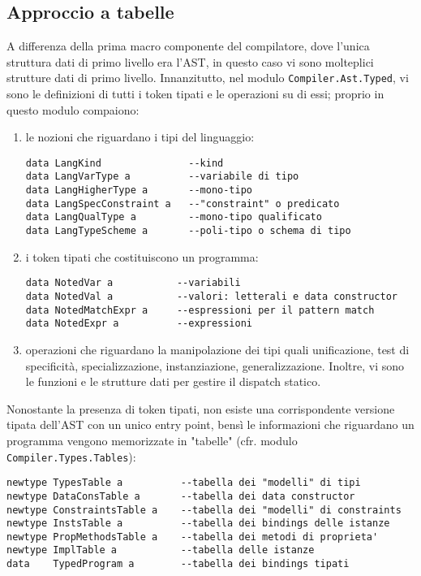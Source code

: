 \documentclass[10pt,a4paper]{article}
\begin{document}
\subsection{Approccio a tabelle}
A differenza della prima macro componente del compilatore, dove l'unica struttura dati di primo livello era l'AST, in
questo caso vi sono molteplici strutture dati di primo livello. Innanzitutto, nel modulo \texttt{Compiler.Ast.Typed},
vi sono le definizioni di tutti i token tipati e le operazioni su di essi; proprio in questo modulo compaiono:
\begin{enumerate}
    \item le nozioni che riguardano i tipi del linguaggio:
    \begin{lstlisting}
data LangKind               --kind
data LangVarType a          --variabile di tipo
data LangHigherType a       --mono-tipo
data LangSpecConstraint a   --"constraint" o predicato
data LangQualType a         --mono-tipo qualificato
data LangTypeScheme a       --poli-tipo o schema di tipo
    \end{lstlisting}
    \item i token tipati che costituiscono un programma:
    \begin{lstlisting}
data NotedVar a           --variabili
data NotedVal a           --valori: letterali e data constructor
data NotedMatchExpr a     --espressioni per il pattern match
data NotedExpr a          --expressioni
    \end{lstlisting}
    \item operazioni che riguardano la manipolazione dei tipi quali unificazione, test di specificità, specializzazione,
    instanziazione, generalizzazione. Inoltre, vi sono le funzioni e le strutture dati per gestire il dispatch statico.
\end{enumerate}
Nonostante la presenza di token tipati, non esiste una corrispondente versione tipata dell'AST con un unico entry point,
bensì le informazioni che riguardano un programma vengono memorizzate in "tabelle" (cfr. modulo
\texttt{Compiler.Types.Tables}):
\begin{lstlisting}
newtype TypesTable a          --tabella dei "modelli" di tipi
newtype DataConsTable a       --tabella dei data constructor
newtype ConstraintsTable a    --tabella dei "modelli" di constraints
newtype InstsTable a          --tabella dei bindings delle istanze
newtype PropMethodsTable a    --tabella dei metodi di proprieta'
newtype ImplTable a           --tabella delle istanze
data    TypedProgram a        --tabella dei bindings tipati
\end{lstlisting}
\end{document}
